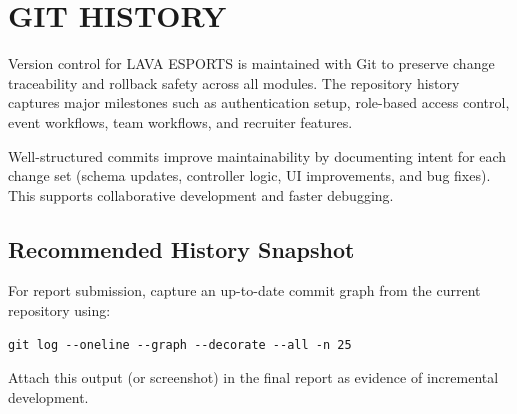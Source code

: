\chapter{GIT HISTORY}
Version control for LAVA ESPORTS is maintained with Git to preserve change traceability and rollback safety across all modules. The repository history captures major milestones such as authentication setup, role-based access control, event workflows, team workflows, and recruiter features.

Well-structured commits improve maintainability by documenting intent for each change set (schema updates, controller logic, UI improvements, and bug fixes). This supports collaborative development and faster debugging.

\section{Recommended History Snapshot}
For report submission, capture an up-to-date commit graph from the current repository using:
\begin{verbatim}
git log --oneline --graph --decorate --all -n 25
\end{verbatim}
Attach this output (or screenshot) in the final report as evidence of incremental development.
